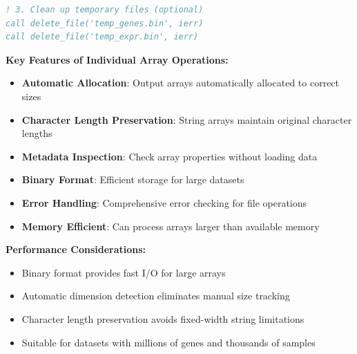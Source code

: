 \begin{enumerate}
\begin{itemize}
\begin{lstlisting}[language=Fortran, caption={Manual Archive Creation}]
! 3. Clean up temporary files (optional)
call delete_file('temp_genes.bin', ierr)
call delete_file('temp_expr.bin', ierr)
                  \end{lstlisting}
                  
                  \textbf{Key Features of Individual Array Operations:}
                  \begin{itemize}
                    \item \textbf{Automatic Allocation}: Output arrays automatically allocated
                          to correct sizes
                          
                    \item \textbf{Character Length Preservation}: String arrays maintain
                          original character lengths
                          
                    \item \textbf{Metadata Inspection}: Check array properties without loading
                          data
                          
                    \item \textbf{Binary Format}: Efficient storage for large datasets
                          
                    \item \textbf{Error Handling}: Comprehensive error checking for file
                          operations
                          
                    \item \textbf{Memory Efficient}: Can process arrays larger than available
                          memory
                  \end{itemize}
                  
                  \textbf{Performance Considerations:}
                  \begin{itemize}
                    \item Binary format provides fast I/O for large arrays
                          
                    \item Automatic dimension detection eliminates manual size tracking
                          
                    \item Character length preservation avoids fixed-width string limitations
                          
                    \item Suitable for datasets with millions of genes and thousands of samples
                  \end{itemize}
          \end{itemize}
\end{enumerate}